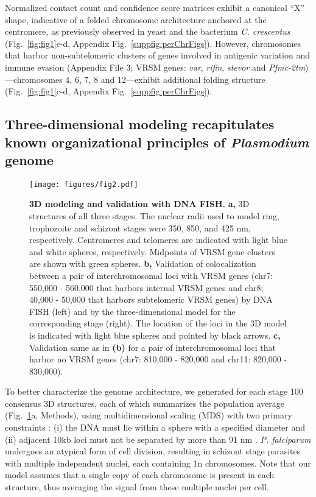 Normalized contact count and confidence score matrices exhibit a canonical
``X'' shape, indicative of a folded chromosome architecture anchored at the
centromere, as previously observed in yeast \citep{duan:three,
tanizawa:mapping} and the bacterium {\em C. crescentus}
\citep{umbarger:three-dimensional} (Fig.~\ref{fig:fig1}c-d, Appendix
Fig.~\ref{suppfig:perChrFigs}). However, chromosomes that harbor
non-subtelomeric clusters of genes involved in antigenic variation and immune
evasion (Appendix File 3; VRSM genes: {\em var}, {\em rifin}, {\em
stevor} and {\em Pfmc-2tm})---chromosomes 4, 6, 7, 8 and 12---exhibit
additional folding structure (Fig.~\ref{fig:fig1}c-d, Appendix
Fig.~\ref{suppfig:perChrFigs}).

\subsection{Three-dimensional modeling recapitulates known organizational principles of {\em Plasmodium} genome}

\begin{figure}[h]
\centering
\texttt{[image: figures/fig2.pdf]}
\caption{{\bf 3D modeling and validation with DNA FISH.}
 \textbf{a,} 3D structures of all three stages. The nuclear radii used to
 model ring, trophozoite and schizont stages were 350, 850, and 425 nm,
 respectively. Centromeres and telomeres are indicated with light blue and
 white spheres, respectively. Midpoints of VRSM gene clusters are shown with
 green spheres. \textbf{b,} Validation of colocalization between a pair of
 interchromosomal loci with VRSM genes (chr7: 550,000 - 560,000 that harbors
 internal VRSM genes and chr8: 40,000 - 50,000 that harbors subtelomeric VRSM
 genes) by DNA FISH (left) and by the three-dimensional model for the
 corresponding stage (right). The location of the loci in the 3D model is
 indicated with light blue spheres and pointed by black arrows. \textbf{c,}
 Validation same as in \textbf{(b)} for a pair of interchromosomal loci that
 harbor no VRSM genes (chr7: 810,000 - 820,000 and chr11: 820,000 - 830,000).
 }
 \label{fig:fig2}
 \end{figure}




To better characterize the genome architecture, we generated for each stage
100 consensus 3D structures, each of which summarizes the population average
(Fig.~\ref{fig:fig2}a, Methods), using multidimensional scaling (MDS) with two
primary constraints \citep{duan:three}: (i) the DNA must lie within a sphere
with a specified diameter \citep{bannister:making, weiner:3d} and (ii)
adjacent 10kb loci must not be separated by more than 91 nm
\citep{bystricky:long-range}. \emph{P. falciparum} undergoes an atypical form
of cell division, resulting in schizont stage parasites with multiple
independent nuclei, each containing 1n chromosomes. Note that our model
assumes that a single copy of each chromosome is present in each structure,
thus averaging the signal from these multiple nuclei per cell.


